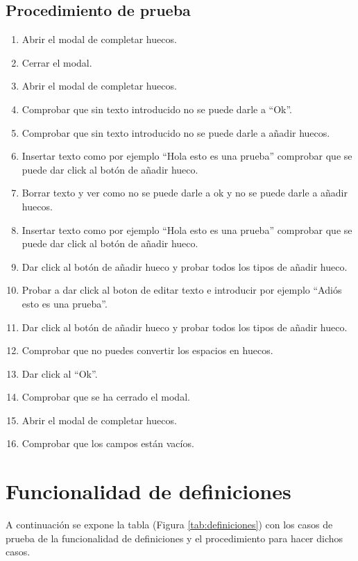 \subsection{Procedimiento de prueba}
\label{procedimientoPruebas:huecos}
\begin{enumerate}
    \item Abrir el modal de completar huecos.
    \item Cerrar el modal.
    \item Abrir el modal de completar huecos.
    \item Comprobar que sin texto introducido no se puede darle a ``Ok''. 
    \item Comprobar que sin texto introducido no se puede darle a añadir huecos.
    \item Insertar texto como por ejemplo ``Hola esto es una prueba'' comprobar que se puede dar click al botón de añadir hueco.
    \item Borrar texto y ver como no se puede darle a ok y no se puede darle a añadir huecos.
    \item Insertar texto como por ejemplo ``Hola esto es una prueba'' comprobar que se puede dar click al botón de añadir hueco.
    \item Dar click al botón de añadir hueco y probar todos los tipos de añadir hueco.
    \item Probar a dar click al boton de editar texto e introducir por ejemplo ``Adiós esto es una prueba''. 
    \item Dar click al botón de añadir hueco y probar todos los tipos de añadir hueco.
    \item Comprobar que no puedes convertir los espacios en huecos.
    \item Dar click al ``Ok''. 
    \item Comprobar que se ha cerrado el modal.
    \item Abrir el modal de completar huecos.
    \item Comprobar que los campos están vacíos.
\end{enumerate}

\section{Funcionalidad de definiciones}
\label{planPruebas:definiciones}
A continuación se expone la tabla (Figura \ref{tab:definiciones}) con los casos de prueba de la funcionalidad de definiciones y el procedimiento para hacer dichos casos.

